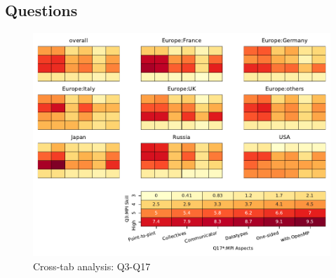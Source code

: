 
\subsection{Questions}


\begin{figure}
\begin{center}
\includegraphics[width=12cm]{../pdfs/Q3-Q17.pdf}
\caption{Cross-tab analysis: Q3-Q17}
\label{fig:Q3-Q17}
\end{center}
\end{figure}
